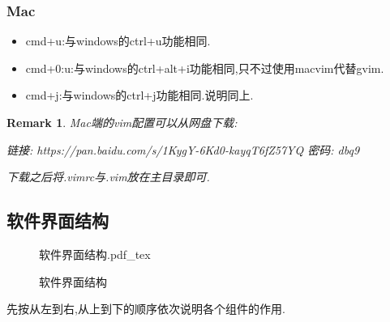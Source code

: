 \documentclass[AutoFakeBold,letterpaper,12pt,hidelinks]{article}
\newtheorem*{Rmk}{Remark}
\newcommand{\incfig}[1]{%
    \def\svgwidth{\columnwidth}
    {#1.pdf_tex}
}
\begin{document}
\subsubsection{Mac}%

\begin{itemize}
	\item cmd+u:与windows的ctrl+u功能相同.
	\item cmd+0:u:与windows的ctrl+alt+i功能相同,只不过使用macvim代替gvim.

	\item  cmd+j:与windows的ctrl+j功能相同.说明同上.
\end{itemize}

\begin{Rmk}\rm
	Mac端的vim配置可以从网盘下载:

	链接: https://pan.baidu.com/s/1KygY-6Kd0-kayqT6fZ57YQ  密码: dbq9

	下载之后将.vimrc与.vim放在主目录即可.
\end{Rmk}
\subsection{软件界面结构}%

\begin{figure}[H]
    \centering
    \incfig{软件界面结构}
    \caption{软件界面结构}
    \label{fig:软件界面结构}
\end{figure}
先按从左到右,从上到下的顺序依次说明各个组件的作用.
\end{document}
